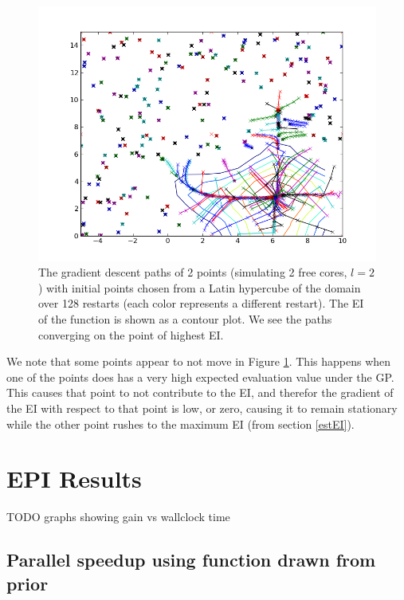 \documentclass[phd,tocprelim]{cornell}
\begin{document}
\begin{figure}[hpt]
 	\centerline{\includegraphics[width=\textwidth]{figures/EPI/branin_2d_32pk_paths_and_EI.png}}
    \caption[Gradient descent paths in Branin Function]{The gradient descent paths of 2 points (simulating 2 free cores, $l=2$) with initial points chosen from a Latin hypercube of the domain over 128 restarts (each color represents a different restart). The EI of the function is shown as a contour plot. We see the paths converging on the point of highest EI.}
 	\label{fig:pk_paths}
 \end{figure}

 We note that some points appear to not move in Figure \ref{fig:pk_paths}. This happens when one of the points does has a very high expected evaluation value under the GP. This causes that point to not contribute to the EI, and therefor the gradient of the EI with respect to that point is low, or zero, causing it to remain stationary while the other point rushes to the maximum EI (from section \ref{estEI}).



\chapter{EPI Results} %
\label{cha:EPI Results}

TODO graphs showing gain vs wallclock time

\section{Parallel speedup using function drawn from prior}
\end{document}
